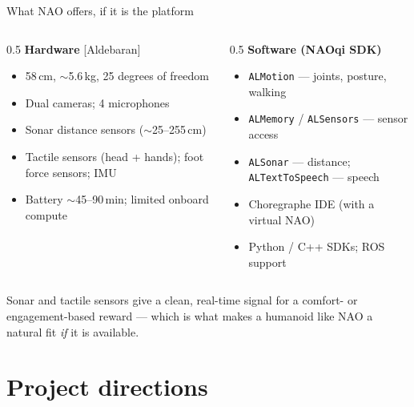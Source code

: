 \documentclass[aspectratio=169,10pt]{beamer}
\newcommand{\refnum}[1]{{\footnotesize\color{giuaccent}[#1]}}
\begin{document}
\begin{frame}{What NAO offers, if it is the platform}
  \begin{columns}[T]
    \begin{column}{0.5\textwidth}
      \textbf{Hardware} \refnum{Aldebaran}
      \begin{itemize}\footnotesize
        \item 58\,cm, $\sim$5.6\,kg, 25 degrees of freedom
        \item Dual cameras; 4 microphones
        \item Sonar distance sensors ($\sim$25--255\,cm)
        \item Tactile sensors (head + hands); foot force sensors; IMU
        \item Battery $\sim$45--90\,min; limited onboard compute
      \end{itemize}
    \end{column}
    \begin{column}{0.5\textwidth}
      \textbf{Software (NAOqi SDK)}
      \begin{itemize}\footnotesize
        \item \texttt{ALMotion} --- joints, posture, walking
        \item \texttt{ALMemory} / \texttt{ALSensors} --- sensor access
        \item \texttt{ALSonar} --- distance; \texttt{ALTextToSpeech} --- speech
        \item Choregraphe IDE (with a virtual NAO)
        \item Python / C++ SDKs; ROS support
      \end{itemize}
    \end{column}
  \end{columns}
  \vspace{0.4em}
  {\footnotesize Sonar and tactile sensors give a clean, real-time signal for a comfort- or engagement-based reward --- which is what makes a humanoid like NAO a natural fit \emph{if} it is available.}
\end{frame}

\section{Project directions}
\end{document}
